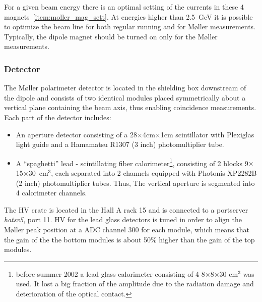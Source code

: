 {For a given beam energy there is an optimal setting of the currents in 
these 4 magnets~\ref{item:moller_mag_sett}.
At energies higher than 2.5~GeV it is possible
to optimize the beam line for both regular running and for 
M{\o}ller measurements. Typically, the dipole magnet should be turned on
only for the M{\o}ller measurements. 

\subsubsection {Detector}
\label{sec:moller_compon_det}

The M{\o}ller polarimeter detector is located in the shielding box downstream 
of the dipole and consists of two identical modules placed symmetrically about a vertical
plane containing the beam axis, thus enabling   
coincidence measurements.
Each part of the detector includes:
\begin{itemize}
  \item An aperture detector consisting of a 28$\times$4cm$\times$1cm 
        scintillator  with Plexiglas light guide and a Hamamatsu R1307 (3 inch)
        photomultiplier tube.
  \item A ``spaghetti'' lead - scintillating fiber calorimeter\footnote{
         before summer 2002 a lead glass calorimeter consisting of 4 
         8$\times$8$\times$30 cm$^3$
         was used. It lost a big fraction of the amplitude due
         to the radiation damage and deterioration of the optical contact.},
        consisting of 2 blocks 9$\times$15$\times$30~cm$^3$, each separated into 2
        channels equipped with Photonis XP2282B (2 inch) photomultiplier tubes. Thus,
        The vertical aperture is segmented into 4 calorimeter channels.
\end{itemize}
The HV crate is located in the Hall A rack 15 and is connected
to a portserver {\em hatsv5}, port 11.
HV for the lead glass detectors is tuned in order to align the M{\o}ller peak
position at a ADC channel 300 for each module, which means that the gain
of the the bottom modules is about 50\% higher than the gain of the top
modules.

}
